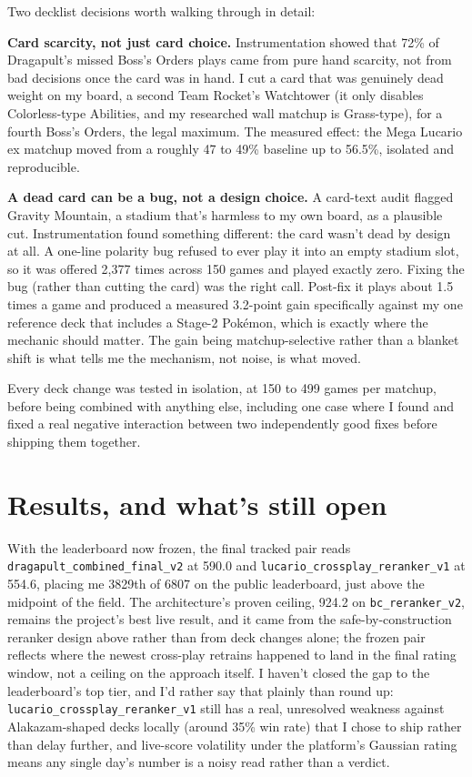 \documentclass[11pt]{article}
\begin{document}
Two decklist decisions worth walking through in detail:

\textbf{Card scarcity, not just card choice.} Instrumentation showed that 72\% of Dragapult's missed Boss's Orders plays came from pure hand scarcity, not from bad decisions once the card was in hand. I cut a card that was genuinely dead weight on my board, a second Team Rocket's Watchtower (it only disables Colorless-type Abilities, and my researched wall matchup is Grass-type), for a fourth Boss's Orders, the legal maximum. The measured effect: the Mega Lucario ex matchup moved from a roughly 47 to 49\% baseline up to 56.5\%, isolated and reproducible.

\textbf{A dead card can be a bug, not a design choice.} A card-text audit flagged Gravity Mountain, a stadium that's harmless to my own board, as a plausible cut. Instrumentation found something different: the card wasn't dead by design at all. A one-line polarity bug refused to ever play it into an empty stadium slot, so it was offered 2,377 times across 150 games and played exactly zero. Fixing the bug (rather than cutting the card) was the right call. Post-fix it plays about 1.5 times a game and produced a measured 3.2-point gain specifically against my one reference deck that includes a Stage-2 Pok\'emon, which is exactly where the mechanic should matter. The gain being matchup-selective rather than a blanket shift is what tells me the mechanism, not noise, is what moved.

Every deck change was tested in isolation, at 150 to 499 games per matchup, before being combined with anything else, including one case where I found and fixed a real negative interaction between two independently good fixes before shipping them together.

\section*{Results, and what's still open}

With the leaderboard now frozen, the final tracked pair reads \texttt{dragapult\_combined\_final\_v2} at 590.0 and \texttt{lucario\_crossplay\_reranker\_v1} at 554.6, placing me 3829th of 6807 on the public leaderboard, just above the midpoint of the field. The architecture's proven ceiling, 924.2 on \texttt{bc\_reranker\_v2}, remains the project's best live result, and it came from the safe-by-construction reranker design above rather than from deck changes alone; the frozen pair reflects where the newest cross-play retrains happened to land in the final rating window, not a ceiling on the approach itself. I haven't closed the gap to the leaderboard's top tier, and I'd rather say that plainly than round up: \texttt{lucario\_crossplay\_reranker\_v1} still has a real, unresolved weakness against Alakazam-shaped decks locally (around 35\% win rate) that I chose to ship rather than delay further, and live-score volatility under the platform's Gaussian rating means any single day's number is a noisy read rather than a verdict.
\end{document}
